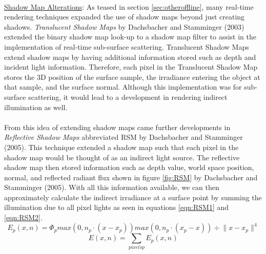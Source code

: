 \paragraph{}
\underline{Shadow Map Alterations}: As teased in section \ref{sec:otheroffline}, many real-time rendering techniques expanded the use of shadow maps beyond just creating shadows.  \textit{Translucent Shadow Maps} by Dachsbacher and Stamminger (2003) extended the binary shadow map look-up to a shadow map filter to assist in the implementation of real-time sub-surface scattering.  Translucent Shadow Maps extend shadow maps by having additional information stored such as depth and incident light information.  Therefore, each pixel in the Translucent Shadow Map stores the 3D position of the surface sample, the irradiance entering the object at that sample, and the surface normal.  Although this implementation was for sub-surface scattering, it would lead to a development in rendering indirect illumination as well.

\paragraph{}
From this idea of extending shadow maps came further developments in \textit{Reflective Shadow Maps} abbreviated RSM by Dachsbacher and Stamminger (2005).  This technique extended a shadow map such that each pixel in the shadow map would be thought of as an indirect light source.  The reflective shadow map then stored information such as depth value, world space position, normal, and reflected radiant flux shown in figure \ref{fig:RSM} by Dachsbacher and Stamminger (2005).  With all this information available, we can then approximately calculate the indirect irradiance at a surface point by summing the illumination due to all pixel lights as seen in equations \ref{eqn:RSM1} and \ref{eqn:RSM2}.
\begin{equation}
E_{p} (x,n) = \Phi_{p} {max(0, n_{p} \cdot (x-x_{p})) max(0, n_{p} \cdot (x_{p} - x))  } \div {\| x-x_{p} \|^{4} } \label{eqn:RSM1}
\end{equation}
\begin{equation}
E(x,n) = \sum_{pixels p} E_{p}(x,n) \label{eqn:RSM2}
\end{equation}

